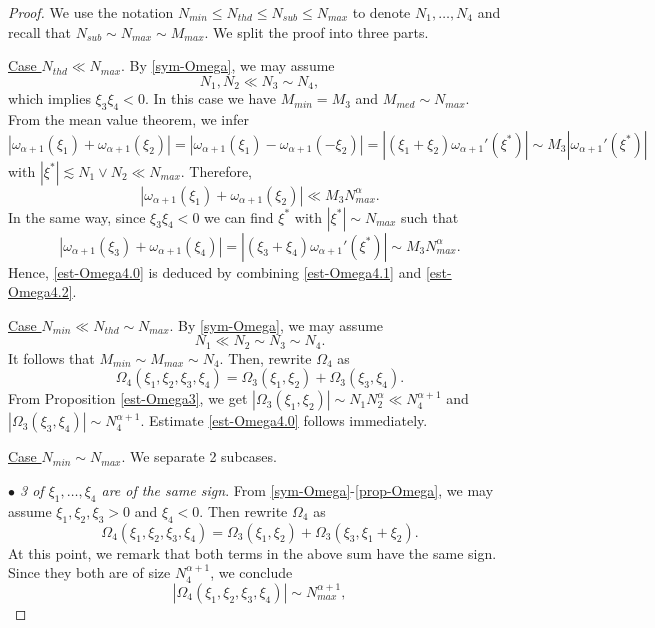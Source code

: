 \documentclass{amsart}
\theoremstyle{definition}
\theoremstyle{remark}
\numberwithin{equation}{section}
\begin{document}
\begin{proof}
  We use the notation $N_{min}\le N_{thd}\le N_{sub}\le N_{max}$ to denote $N_1,\ldots,N_4$ and recall that $N_{sub}\sim N_{max}\sim M_{max}$. We split the proof into three parts.
  
  \noindent
  \underline{Case $N_{thd} \ll N_{max}$}. By \eqref{sym-Omega}, we may assume
  $$
  N_1, N_2 \ll N_3\sim N_4,
  $$
  which implies $\xi_3\xi_4 < 0$. In this case we have $M_{min}=M_3$ and $M_{med}\sim N_{max}$.\\
  From the mean value theorem, we infer
  $$
  |\omega_{\alpha+1}(\xi_1)+\omega_{\alpha+1}(\xi_2)| = |\omega_{\alpha+1}(\xi_1)-\omega_{\alpha+1}(-\xi_2)| = |(\xi_1+\xi_2)\omega_{\alpha+1}'(\xi^\ast)|\sim M_3 |\omega_{\alpha+1}'(\xi^\ast)| 
  $$
  with $|\xi^\ast|\lesssim N_1\vee N_2\ll N_{max}$. Therefore,
  \begin{equation}\label{est-Omega4.1}
  |\omega_{\alpha+1}(\xi_1)+\omega_{\alpha+1}(\xi_2)| \ll M_3N_{max}^\alpha.
  \end{equation}
  In the same way, since $\xi_3\xi_4<0$ we can find $\xi^\ast$ with $|\xi^\ast|\sim N_{max}$ such that
  \begin{equation}\label{est-Omega4.2}
  |\omega_{\alpha+1}(\xi_3)+\omega_{\alpha+1}(\xi_4)| = |(\xi_3+\xi_4)\omega_{\alpha+1}'(\xi^\ast)| \sim M_3 N_{max}^\alpha.
  \end{equation}
  Hence, \eqref{est-Omega4.0} is deduced by combining \eqref{est-Omega4.1} and \eqref{est-Omega4.2}.
  
  \noindent
  \underline{Case $N_{min}\ll N_{thd} \sim N_{max}$}. By \eqref{sym-Omega}, we may assume
  $$
  N_1\ll N_2\sim N_3\sim N_4.
  $$
  It follows that $M_{min}\sim M_{max}\sim N_4$. Then, rewrite $\Omega_4$ as 
  $$
  \Omega_4(\xi_1,\xi_2,\xi_3,\xi_4) = \Omega_3(\xi_1,\xi_2) + \Omega_3(\xi_3,\xi_4).
  $$
  From Proposition \ref{est-Omega3}, we get $|\Omega_3(\xi_1,\xi_2)| \sim N_1 N_2^\alpha \ll N_4^{\alpha+1}$ and $|\Omega_3(\xi_3,\xi_4)|\sim N_4^{\alpha+1}$. Estimate \eqref{est-Omega4.0} follows immediately.
  
  \noindent
  \underline{Case $N_{min} \sim N_{max}$}. We separate 2 subcases.
  
  \noindent
  \textit{$\bullet$ 3 of $\xi_1,\ldots ,\xi_4$ are of the same sign}. From \eqref{sym-Omega}-\eqref{prop-Omega}, we may assume $\xi_1,\xi_2,\xi_3>0$ and $\xi_4<0$. Then rewrite $\Omega_4$ as
  \begin{equation}\label{est-Omega4.3}
  \Omega_4(\xi_1,\xi_2,\xi_3,\xi_4) = \Omega_3(\xi_1,\xi_2) + \Omega_3(\xi_3,\xi_1+\xi_2).
  \end{equation}
  At this point, we remark that both terms in the above sum have the same sign. Since they both are of size $N_4^{\alpha+1}$, we conclude 
   $$
  |\Omega_4(\xi_1,\xi_2,\xi_3,\xi_4)| \sim N_{max}^{\alpha+1},
  $$
  

\end{proof}
\end{document}
